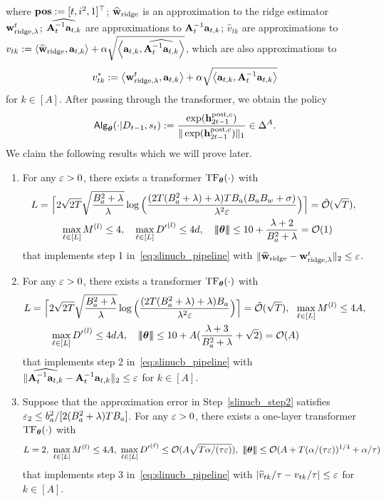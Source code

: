 where ${\mathbf{pos}}:=[t,i^2,1]^\top$; $\widehat{{\mathbf w}}_{{\rm ridge}}$ is an approximation to the ridge estimator ${\mathbf w}^t_{{\rm ridge},\lambda}$; $\widehat{{\mathbf A}_{t}^{-1}{\mathbf a}_{t,k}}$ are approximations to ${{\mathbf A}_{t}^{-1}{\mathbf a}_{t,k}}$;  $\hat v_{tk}$ are approximations to $v_{tk}:=\left\langle\widehat{{\mathbf w}}_{{\rm ridge}},{\mathbf a}_{t,k}\right\rangle+\alpha\sqrt{\left\langle{\mathbf a}_{t,k}, \widehat{{\mathbf A}_t^{-1} {\mathbf a}_{t,k}}\right\rangle}$, which are also approximations to $$
v^*_{tk}:=\left\langle{\mathbf w}^t_{{\rm ridge},\lambda},{\mathbf a}_{t,k}\right\rangle+\alpha\sqrt{\left\langle{\mathbf a}_{t,k}, {{\mathbf A}_t^{-1} {\mathbf a}_{t,k}}\right\rangle}
$$ for $k\in[A]$. After passing through the transformer, we obtain the policy  
$$
{\mathsf{Alg}}_{{{\boldsymbol \theta}}}(\cdot|{D}_{t-1},{s}_t):=\frac{\exp({\mathbf h}^{{\mathrm{post}},{c}}_{2t-1})}{\|\exp({\mathbf h}^{{\mathrm{post}},{c}}_{2t-1})\|_1}\in\Delta^A.$$ 
We claim the following results which we will prove later.
\begin{enumerate}[label=Step \arabic*,ref= \arabic*]
    \item \label{slinucb_step1} For any $\varepsilon>0$, 
    there exists a transformer ${\rm TF}_{\boldsymbol \theta}(\cdot)$ with 
\begin{align*}
&L=\Big\lceil2\sqrt{2T}\sqrt{\frac{B_a^2+\lambda}{\lambda}}\log\Big(\frac{(2T(B_a^2+\lambda)+\lambda)TB_a(B_aB_w+\sigma)}{\lambda^2\varepsilon}\Big)\Big\rceil={\tilde{\mathcal O}}(\sqrt{T}),\\
&~~~\qquad\max_{\ell\in[L]}M^{(l)}\leq4,~~~\max_{\ell\in[L]}{D'}^{(l)}\leq4d,~~~ {\left|\!\left|\!\left|{{\boldsymbol \theta}}\right|\!\right|\!\right|}\leq  10+\frac{\lambda+2}{B_a^2+\lambda}=\mathcal{O}(1) \end{align*}
 that implements step 1 in~\eqref{eq:slinucb_pipeline} with  $\|\widehat{{\mathbf w}}_{{\rm ridge}}-{\mathbf w}^t_{{\rm ridge},\lambda}\|_2\leq\varepsilon$.
   \item\label{slinucb_step2}
   For any $\varepsilon>0$, there exists a transformer ${\rm TF}_{\boldsymbol \theta}(\cdot)$ with 
\begin{align*}
&L=\Big\lceil2\sqrt{2T}\sqrt{\frac{B_a^2+\lambda}{\lambda}}\log\Big(\frac{(2T(B_a^2+\lambda)+\lambda)B_a}{\lambda^2\varepsilon}\Big)\Big\rceil={\tilde{\mathcal O}}(\sqrt{T}),~~\max_{\ell\in[L]}M^{(l)}\leq4A,\\
&\qquad~~
\max_{\ell\in[L]}{D'}^{(l)}\leq4dA,~~~ {\left|\!\left|\!\left|{{\boldsymbol \theta}}\right|\!\right|\!\right|}\leq  10+A(\frac{\lambda+3}{B_a^2+\lambda}+\sqrt{2})=\mathcal{O}(A) \end{align*}
 that implements step 2 in~\eqref{eq:slinucb_pipeline} with  $\|\widehat{{\mathbf A}_{t}^{-1}{\mathbf a}_{t,k}}-{\mathbf A}_{t}^{-1}{\mathbf a}_{t,k}\|_2\leq\varepsilon$ for $k\in[A]$.
  \item\label{slinucb_step3} Suppose that the approximation error in Step~\ref{slinucb_step2} satisfies $\varepsilon_2\leq b_a^2/[2(B_a^2+\lambda)TB_a]$.
  For any $\varepsilon>0$, 
  there exists a one-layer transformer ${\rm TF}_{\boldsymbol \theta}(\cdot)$ with 
    $$
    L=2,~\max_{\ell\in[L]}M^{(l)}\leq 4A,~ \max_{\ell\in[L]}{D'}^{(\ell)}\leq \mathcal{O}(A\sqrt{T\alpha/({\tau}\varepsilon)}),~{\left|\!\left|\!\left|{{\boldsymbol \theta}}\right|\!\right|\!\right|}\leq  \mathcal{O}(A+T({\alpha/({\tau}\varepsilon)})^{1/4}+\alpha/{\tau}) $$
 that implements step 3 in~\eqref{eq:slinucb_pipeline} with  $|\widehat v_{tk}/{\tau}-v_{tk}/{\tau}|\leq\varepsilon$ for $k\in[A]$.
\end{enumerate}
